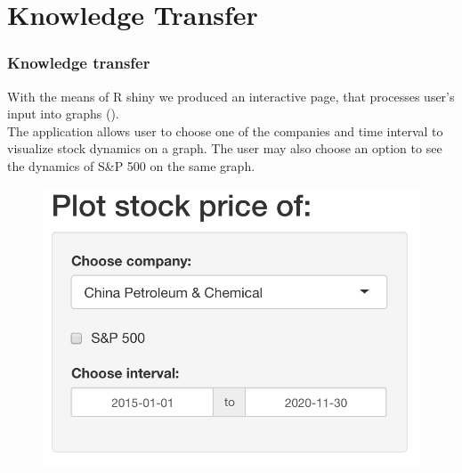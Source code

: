 \documentclass {beamer}
\begin{document}
\section{Knowledge Transfer}
\begin{frame}
\frametitle{Knowledge transfer}
With the means of R shiny we produced an interactive page, that processes user's input into graphs ().\\
The application allows user to choose one of the companies and time interval to visualize stock dynamics on a graph. The user may also choose an option to see the dynamics of S\&P 500 on the same graph.\\

\begin{figure}[!h]
\includegraphics[scale=0.25]{screenshot1}
\label{fig:ss1}
\end{figure}
\end{frame}

\end{document}
